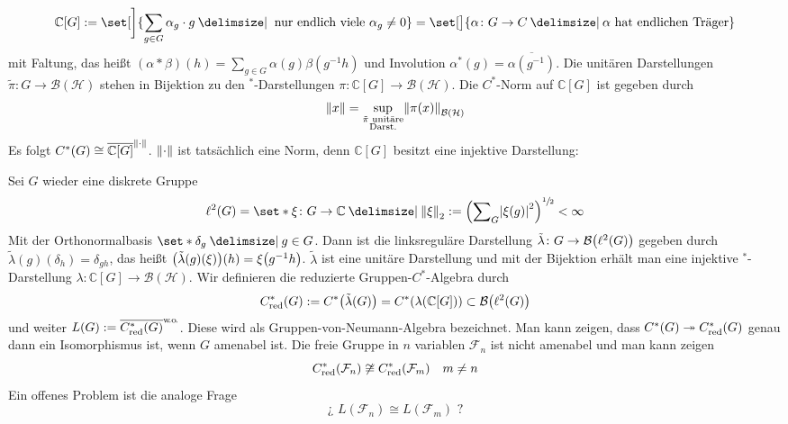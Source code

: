 \begin{beispiel}
\begin{enumerate}[(i)]
\begin{enumerate}[a)]
			\[
				\mathbb{C}[G] := \set[\bigg]{\sum_{g \in G}\alpha_g \cdot g \given \text{ nur endlich viele } \alpha_g\neq 0} = \set[\big]{\alpha \colon G \to C \given \alpha \text{ hat endlichen Träger} }
			\]
			mit Faltung, das heißt $(\alpha * \beta)(h) = \sum_{g \in G} \alpha(g) \beta(g^{-1}h)$ und Involution $\alpha^*(g)=\overline{\alpha(g^{-1})}$.
			Die unitären Darstellungen $\tilde{\pi} \colon G \to \mathcal{B}(\mathcal{H})$ stehen in Bijektion zu den $^*$-Darstellungen $\pi \colon \mathbb{C}[G] \to \mathcal{B}(\mathcal{H})$.
			Die $C^*$-Norm auf $\mathbb{C}[G]$ ist gegeben durch
			\[
				\norm*{x} = \sup_{\substack{\tilde{\pi} \text{ unitäre} \\ \text{Darst.}}} \norm*{\pi(x)}_{\mathcal{B}(\mathcal{H})}
			\]
			Es folgt $C^*(G) \cong \overline{\mathbb{C}[G]}^{\norm*{\cdot}}$. $\norm*{\cdot }$ ist tatsächlich eine Norm, denn $\mathbb{C}[G]$ besitzt eine injektive Darstellung:
		\end{enumerate}
	\end{enumerate}
\end{beispiel}

\begin{beispiel}
	Sei $G$ wieder eine diskrete Gruppe
	\[
		\ell^2(G) = \set*{\xi \colon G \to \mathbb{C} \given \norm*{\xi}_2 := \enbrace*{\sum\nolimits_G \abs*{\xi(g)}^2 }^{\sfrac{1}{2}} < \infty}
	\]
	Mit der Orthonormalbasis $\set*{\delta_g \given g \in G}$. Dann ist die linksreguläre Darstellung $\tilde{\lambda} \colon G \to \mathcal{B} \enbrace*{\ell^2(G)}$ gegeben durch $\tilde{\lambda}(g)(\delta_h) = \delta_{gh}$, das heißt $\enbrace*{\tilde{\lambda}(g)(\xi)}(h) = \xi \enbrace*{g ^{-1}h}$.
	$\tilde{\lambda}$ ist eine unitäre Darstellung und mit der Bijektion erhält man eine injektive $^*$-Darstellung $\lambda \colon \mathbb{C}[G] \to \mathcal{B}(\mathcal{H})$.
	Wir definieren die reduzierte Gruppen-$C^*$-Algebra durch
	\[
		C^*_{\red}(G) := C^* \enbrace*{\tilde{\lambda}(G)}= C^* \enbrace*{\lambda \enbrace*{\mathbb{C}[G]}} \subset \mathcal{B} \enbrace*{\ell^2(G)}
	\]
	und weiter $L(G) := \overline{C^*_{\red}(G)}^\wo$. Diese wird als Gruppen-von-Neumann-Algebra bezeichnet.
	Man kann zeigen, dass $C^*(G) \twoheadrightarrow C^*_{\red}(G)$ genau dann ein Isomorphismus ist, wenn $G$ amenabel ist.
	Die freie Gruppe in $n$ variablen $\mathcal{F}_n$ ist nicht amenabel und man kann zeigen
	\[
		C^*_{\red}(\mathcal{F}_n) \not\cong C^*_{\red}(\mathcal{F}_m) \quad m \neq n
	\]
	Ein offenes Problem ist die analoge Frage 
	\[
		\text{¿ } L(\mathcal{F}_n) \cong L (\mathcal{F}_m) \text{ ?}  
	\]
\end{beispiel}

